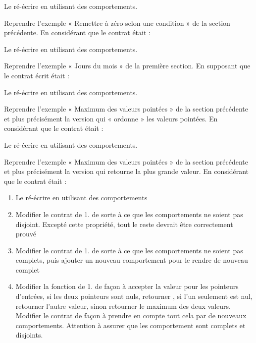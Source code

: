 

Le ré-écrire en utilisant des comportements.




Reprendre l'exemple « Remettre à zéro selon une condition » de la section
précédente. En considérant que le contrat était :





Le ré-écrire en utilisant des comportements.



Reprendre l'exemple « Jours du mois » de la première section.
En supposant que le contrat écrit était :





Le ré-écrire en utilisant des comportements.




Reprendre l'exemple « Maximum des valeurs pointées » de la section
précédente et plus précisément la version qui « ordonne » les valeurs
pointées. En considérant que le contrat était :





Le ré-écrire en utilisant des comportements.





Reprendre l'exemple « Maximum des valeurs pointées » de la section
précédente et plus précisément la version qui retourne la plus grande
valeur. En considérant que le contrat était :




\begin{enumerate}
\item Le ré-écrire en utilisant des comportements
\item Modifier le contrat de 1. de sorte à ce que les comportements ne
  soient pas disjoint. Excepté cette propriété, tout le reste devrait
  être correctement prouvé
\item Modifier le contrat de 1. de sorte à ce que les comportements ne
  soient pas complets, puis ajouter un nouveau comportement pour le
  rendre de nouveau complet
\item Modifier la fonction de 1. de façon à accepter la valeur
   pour les pointeurs d'entrées, si les deux pointeurs
  sont nuls, retourner  , si l'un seulement est
  nul, retourner l'autre valeur, sinon retourner le maximum des deux
  valeurs. Modifier le contrat de façon à prendre en compte tout cela
  par de nouveaux comportements. Attention à assurer que les comportement
  sont complets et disjoints.
\end{enumerate}



